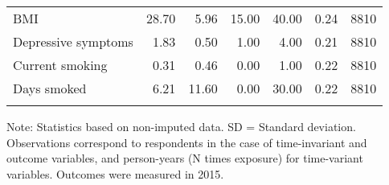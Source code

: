 \begin{table}[htp]
\begin{threeparttable}
\begin{tabular}{lrrrrrr}
  BMI & 28.70 & 5.96 & 15.00 & 40.00 & 0.24 & 8810 \\ 
  Depressive symptoms & 1.83 & 0.50 & 1.00 & 4.00 & 0.21 & 8810 \\ 
  Current smoking & 0.31 & 0.46 & 0.00 & 1.00 & 0.22 & 8810 \\ 
  Days smoked & 6.21 & 11.60 & 0.00 & 30.00 & 0.22 & 8810 \\ 
   \addlinespace
\hline
\addlinespace
\end{tabular}
\endgroup
\begin{tablenotes}
\footnotesize
\item Note: Statistics based on non-imputed data. SD = Standard deviation.
    Observations correspond to respondents
    in the case of time-invariant and outcome variables, and person-years (N times exposure) for
    time-variant variables. Outcomes were measured in 2015.
\end{tablenotes}
\end{threeparttable}
\end{table}

